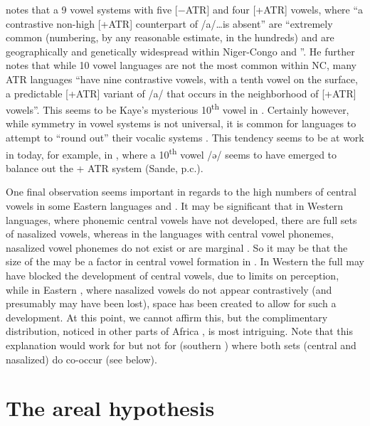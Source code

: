 \documentclass[output=paper
,newtxmath
,modfonts
,nonflat]{langsci/langscibook}
\begin{document}
\citet[501, 502]{Casali2008} notes that a 9 vowel systems with five [$-$ATR] and four [+ATR] vowels, where “a contrastive non-high [+ATR] counterpart of /a/…is absent” are “extremely common (numbering, by any reasonable estimate, in the hundreds) and are geographically and genetically widespread within Niger-Congo and ”. He further notes that while 10 vowel languages are not the most common within NC, many ATR languages “have nine contrastive vowels, with a tenth vowel on the surface, a predictable [+ATR] variant of /a/ that occurs in the neighborhood of [+ATR] vowels”.  This seems to be Kaye’s mysterious 10\textsuperscript{th} vowel in .  Certainly however, while symmetry in vowel systems is not universal, it is common for languages to attempt to “round out” their vocalic systems \citep[21]{Welmers1973}. This tendency seems to be at work in  today, for example, in , where a 10\textsuperscript{th} vowel /ə/ seems to have emerged to balance out the + ATR  system (Sande, p.c.). 

One final observation seems important in regards to the high numbers of central vowels in some Eastern  languages and .  It may be significant that in Western languages, where phonemic central vowels have not developed, there are full sets of nasalized vowels, whereas in the languages with central vowel phonemes, nasalized vowel phonemes do not exist or are marginal \citep{Marchese1979/1983}.  So it may be that the size of the  may be a factor in central vowel formation in . In Western  the full  may have blocked the development of central vowels, due to limits on perception, while in Eastern , where nasalized vowels do not appear contrastively (and presumably may have been lost), space has been created to allow for such a development.  At this point, we cannot affirm this, but the complimentary distribution, noticed in other parts of Africa \citep{Rolle2013}, is most intriguing. Note that this explanation would work for  but not for  (southern ) where both sets (central and nasalized) do co-occur (see below).

\section{The areal hypothesis}\label{sec:zogbo:5} 
\end{document}
